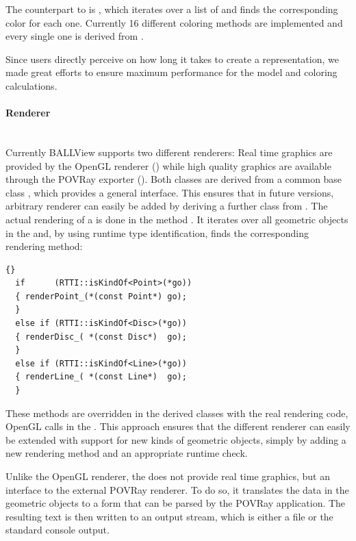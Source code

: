 The counterpart to  is , which 
iterates over a list of  and finds the corresponding 
color for each one. Currently 16 different coloring methods are implemented and
every single one is derived from .

Since users directly perceive on how long it takes to create a representation,
we made great efforts to ensure maximum performance for the model and coloring 
calculations.

\paragraph{Renderer}\label{renderer}
\hspace*{\fill}\\
Currently \mbox{BALLView} supports two different renderers: Real time graphics 
are provided by the OpenGL renderer () while high quality 
graphics are available through the POVRay exporter ().
Both classes are derived from a common base class , which 
provides a general interface. This ensures that in future versions, arbitrary 
renderer can easily be added by deriving a further class from .
The actual rendering of a  is done in the method
. It iterates over all 
geometric objects in the  and, by using runtime type 
identification, finds the corresponding rendering method:

\begin{lstlisting}{}
  if      (RTTI::isKindOf<Point>(*go))
  { renderPoint_(*(const Point*) go);
  }
  else if (RTTI::isKindOf<Disc>(*go))
  { renderDisc_( *(const Disc*)  go);
  }
  else if (RTTI::isKindOf<Line>(*go))
  { renderLine_( *(const Line*)  go);
  }
\end{lstlisting}

\noindent 
These methods are overridden in the derived classes with the real rendering
code, \eg OpenGL calls in the . This approach ensures that 
the different renderer can easily be extended with support for new kinds of 
geometric objects, simply by adding a new rendering method and an appropriate 
runtime check.

Unlike the OpenGL renderer, the  does not provide real 
time graphics, but an interface to the external POVRay renderer. To do so, it 
translates the data in the geometric objects to a form that can be parsed by 
the POVRay application. The resulting text is then written to an output stream,
which is either a file or the standard console output.


